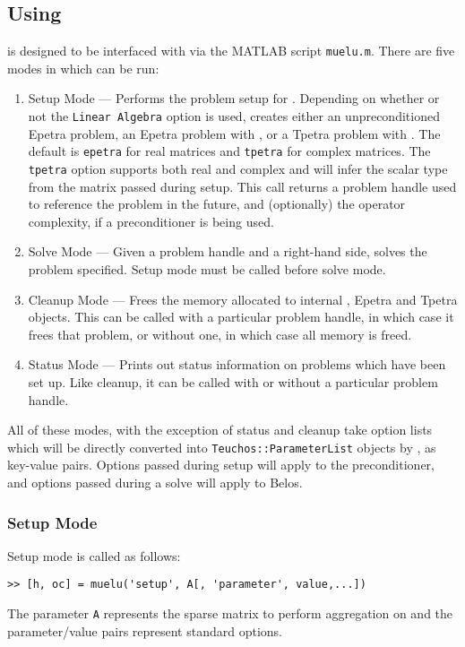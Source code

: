 \subsection{Using \muemex}\label{sec:muemex:usage}
\muemex is designed to be interfaced with via the MATLAB script
\texttt{muelu.m}.  There are five modes in which \muemex can be run:
\begin{enumerate}
\item Setup Mode --- Performs the problem setup for \muelu.
  Depending on whether or not the \texttt{Linear Algebra} option is
  used, \muemex creates either an unpreconditioned Epetra problem,
  an Epetra problem with \muelu, or a Tpetra problem with \muelu.
  The default is \texttt{epetra} for real matrices and \texttt{tpetra}
  for complex matrices. The \texttt{tpetra} option
  supports both real and complex and will infer the scalar type
  from the matrix passed during setup.  This call returns a problem 
  handle used to reference the problem in the future, and (optionally)
  the operator complexity, if a preconditioner is being used.
\item Solve Mode --- Given a problem handle and a right-hand side, \muemex
  solves the problem specified.  Setup mode must be called before
  solve mode.
\item Cleanup Mode --- Frees the memory allocated to internal \muelu,
  Epetra and Tpetra objects.  This can be called with a particular 
  problem handle, in which case it frees that problem, or without one, 
  in which case all \muemex memory is freed.
\item Status Mode --- Prints out status information on problems which
  have been set up.  Like cleanup, it can be called with or without a
  particular problem handle.
\end{enumerate}
All of these modes, with the exception of status and cleanup take
option lists which will be directly converted into
\texttt{Teuchos::ParameterList} objects by \muemex, as key-value pairs.
Options passed during setup will apply to the \muelu preconditioner, and
options passed during a solve will apply to Belos.

\subsubsection{Setup Mode}
Setup mode is called as follows:
\begin{verbatim}
>> [h, oc] = muelu('setup', A[, 'parameter', value,...]) 
\end{verbatim}
The parameter \texttt{A} represents the sparse matrix to perform aggregation on
and the parameter/value pairs represent standard \muelu options.

